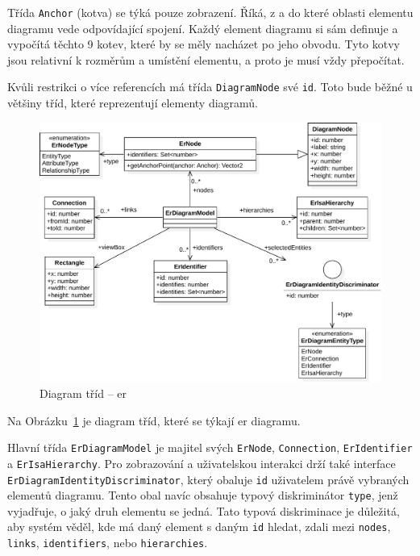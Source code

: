 Třída \texttt{Anchor} (kotva) se týká pouze zobrazení.
Říká, z a do které oblasti elementu diagramu vede odpovídající spojení.
Každý element diagramu si sám definuje a vypočítá těchto 9 kotev, které by se měly nacházet po jeho obvodu.
Tyto kotvy jsou relativní k rozměrům a umístění elementu, a proto je musí vždy přepočítat.

Kvůli restrikci o více referencích má třída \texttt{DiagramNode} své \texttt{id}.
Toto bude běžné u většiny tříd, které reprezentují elementy diagramů.

\begin{figure}[!htb]
  \centering
  \includegraphics[width=\maxwidth{\textwidth}]{../img/diagrams/er-class-diagram.pdf}
  \caption{Diagram tříd -- \acrshort{er}}
  \label{fig:er-class-diagram}
\end{figure}

Na Obrázku~\ref{fig:er-class-diagram} je diagram tříd, které se týkají \acrshort{er} diagramu.

Hlavní třída \texttt{ErDiagramModel} je majitel svých \texttt{ErNode}, \texttt{Connection}, \texttt{ErIdentifier} a \texttt{ErIsaHierarchy}.
Pro zobrazování a uživatelskou interakci drží také interface \texttt{ErDiagramIdentityDiscriminator}, který obaluje \texttt{id} uživatelem právě vybraných elementů diagramu.
Tento obal navíc obsahuje typový diskriminátor \texttt{type}, jenž vyjadřuje, o jaký druh elementu se jedná.
Tato typová diskriminace je důležitá, aby systém věděl, kde má daný element s daným \texttt{id} hledat, zdali mezi \texttt{nodes}, \texttt{links}, \texttt{identifiers}, nebo \texttt{hierarchies}.

